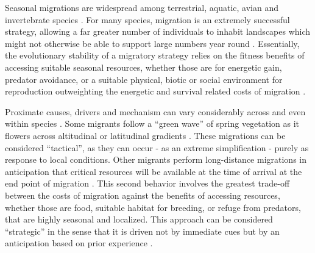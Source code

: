 \documentclass[utf8]{frontiersSCNS} %
\begin{document}
Seasonal migrations are widespread among terrestrial, aquatic, avian and invertebrate species \citep{Dingle2014}. For many species, migration is an extremely successful strategy, allowing a far greater number of individuals to inhabit landscapes which might not otherwise be able to support large numbers year round \citep{Fryxell1988}. Essentially, the evolutionary stability of a migratory strategy relies on the fitness benefits of accessing suitable seasonal resources, whether those are for energetic gain, predator avoidance, or a suitable physical, biotic or social environment for reproduction outweighting the energetic and survival related costs of migration \citep{Avgar2014}. 

Proximate causes, drivers and mechanism can vary considerably across and even within species \citep{Berthold1999, Shaw2016}. Some migrants follow a ``green wave'' of spring vegetation as it flowers across altitudinal or latitudinal gradients \citep{Bischof2012, Kolzsch2015}. These migrations can be considered ``tactical'', as they can occur - as an extreme simplification - purely as response to local conditions. Other migrants perform long-distance migrations in anticipation that critical resources will be available at the time of arrival at the end point of migration \citep{Abrahms2019}. This second behavior involves the greatest trade-off between the costs of migration against the benefits of accessing resources, whether those are food, suitable habitat for breeding, or refuge from predators, that are highly seasonal and localized. This approach can be considered ``strategic'' in the sense that it is driven not by immediate cues but by an anticipation based on prior experience \citep{Bracis2017}.
\end{document}
